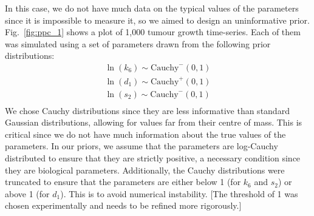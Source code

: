 \documentclass[11pt]{article}
\begin{document}
In this case, we do not have much data on the typical values of the parameters since it is impossible to measure it, so we aimed to design an uninformative prior. Fig.~\ref{fig:ppc_1} shows a plot of 1,000 tumour growth time-series. Each of them was simulated using a set of parameters drawn from the following prior distributions:
\begin{align*}
    \ln(k_6) \sim \text{Cauchy}^-(0, 1) \\ 
    \ln(d_1) \sim \text{Cauchy}^+(0, 1) \\ 
    \ln(s_2) \sim \text{Cauchy}^-(0, 1) \\ 
\end{align*} 
We chose Cauchy distributions since they are less informative than standard Gaussian distributions, allowing for values far from their centre of mass. This is critical since we do not have much information about the true values of the parameters. In our priors, we assume that the parameters are log-Cauchy distributed to ensure that they are strictly positive, a necessary condition since they are biological parameters. Additionally, the Cauchy distributions were truncated to ensure that the parameters are either below 1 (for $k_6$ and $s_2$) or above 1 (for $d_1$). This is to avoid numerical instability. [The threshold of 1 was chosen experimentally and needs to be refined more rigorously.]
\end{document}
